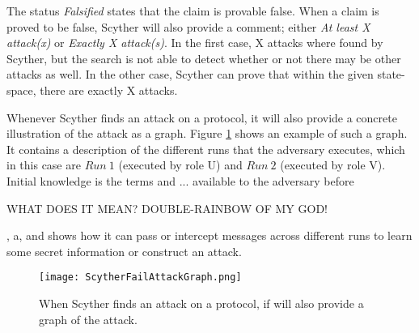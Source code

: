 The status \emph{Falsified} states that the claim is provable false. When a claim is proved to be false, Scyther will also provide a comment; either \emph{At least X attack(x)} or \emph{Exactly X attack(s)}. In the first case, X attacks where found by Scyther, but the search is not able to detect whether or not there may be other attacks as well. In the other case, Scyther can prove that within the given state-space, there are exactly X attacks.

Whenever Scyther finds an attack on a protocol, it will also provide a concrete illustration of the attack as a graph. Figure \ref{fig:scyther-graph} shows an example of such a graph. It contains a description of the different runs that the adversary executes, which in this case are $Run\ 1$ (executed by role U) and $Run\ 2$ (executed by role V). Initial knowledge is the terms and ... available to the adversary before 

WHAT DOES IT MEAN? DOUBLE-RAINBOW OF MY GOD!

, a, and shows how it can pass or intercept messages across different runs to learn some secret information or construct an attack.



\begin{figure}[h]
	\centering
	\texttt{[image: ScytherFailAttackGraph.png]}
	\caption{When Scyther finds an attack on a protocol, if will also provide a graph of the attack.}
	\label{fig:scyther-graph}
\end{figure}
